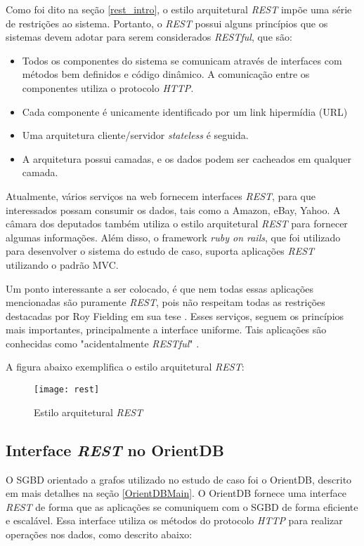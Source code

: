 	Como foi dito na seção \ref{rest_intro}, o estilo arquitetural \textit{REST} impõe uma série de restrições ao sistema. Portanto, o \textit{REST} possui alguns princípios que os sistemas devem adotar para serem considerados \textit{RESTful}, que são: 

\begin{itemize}
	\item Todos os componentes do sistema se comunicam através de interfaces com métodos bem definidos e código dinâmico. A comunicação entre os componentes utiliza o protocolo \textit{HTTP}.
	\item Cada componente é unicamente identificado por um link hipermídia (URL)
	\item Uma arquitetura cliente/servidor \textit{stateless} é seguida.
	\item A arquitetura possui camadas, e os dados podem ser cacheados em qualquer camada.
\end{itemize}

	Atualmente, vários serviços na web fornecem interfaces \textit{REST}, para que interessados possam consumir os dados, tais como a Amazon, eBay, Yahoo. A câmara dos deputados também utiliza o estilo arquitetural \textit{REST} para fornecer algumas informações. Além disso, o framework \textit{ruby on rails}, que foi utilizado para desenvolver o sistema do estudo de caso, suporta aplicações \textit{REST} utilizando o padrão MVC.
	
	Um ponto interessante a ser colocado, é que nem todas essas aplicações mencionadas são puramente \textit{REST}, pois não respeitam todas as restrições destacadas por Roy Fielding em sua tese \cite{fielding2000architectural}. Esses serviços, seguem os princípios mais importantes, principalmente a interface uniforme. Tais aplicações são conhecidas como "acidentalmente \textit{RESTful}" \cite{acident-rest}.

	A figura abaixo exemplifica o estilo arquitetural \textit{REST}:

\begin{figure}[h]
	\centering
    \texttt{[image: rest]}
    \caption{Estilo arquitetural \textit{REST}}
    \label{fig:rest-style}
\end{figure}


\subsection{Interface \textit{REST} no OrientDB}
	O SGBD orientado a grafos utilizado no estudo de caso foi o OrientDB, descrito em mais detalhes na seção \ref{OrientDBMain}. O OrientDB fornece uma interface \textit{REST} de forma que as aplicações se comuniquem com o SGBD de forma eficiente e escalável. Essa interface utiliza os métodos do protocolo \textit{HTTP} para realizar operações nos dados, como descrito abaixo:
	
